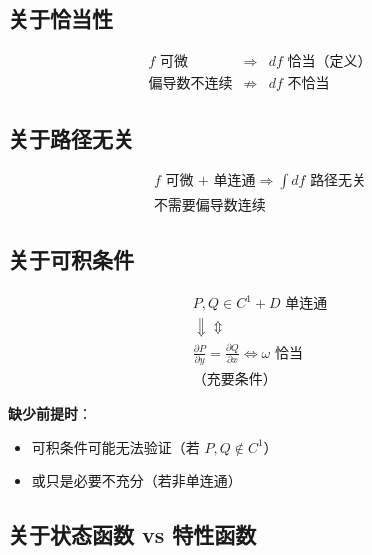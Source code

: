 \documentclass[12pt,a4paper]{article}
\begin{document}
\subsection{关于恰当性}

\begin{equation}
\boxed{
\begin{array}{rcl}
f \text{ 可微} &\Rightarrow& df \text{ 恰当（定义）} \\
\text{偏导数不连续} &\not\Rightarrow& df \text{ 不恰当}
\end{array}
}
\end{equation}

\subsection{关于路径无关}

\begin{equation}
\boxed{
\begin{array}{l}
f \text{ 可微 + 单连通} \Rightarrow \int df \text{ 路径无关} \\
\text{不需要偏导数连续}
\end{array}
}
\end{equation}

\subsection{关于可积条件}

\begin{equation}
\boxed{
\begin{array}{c}
P, Q \in C^1 + D \text{ 单连通} \\
\Downarrow \Updownarrow \\
\frac{\partial P}{\partial y} = \frac{\partial Q}{\partial x} \Leftrightarrow \omega \text{ 恰当} \\
\text{（充要条件）}
\end{array}
}
\end{equation}

\textbf{缺少前提时}：
\begin{itemize}
\item 可积条件可能无法验证（若 $P, Q \notin C^1$）
\item 或只是必要不充分（若非单连通）
\end{itemize}

\subsection{关于状态函数 vs 特性函数}
\end{document}
